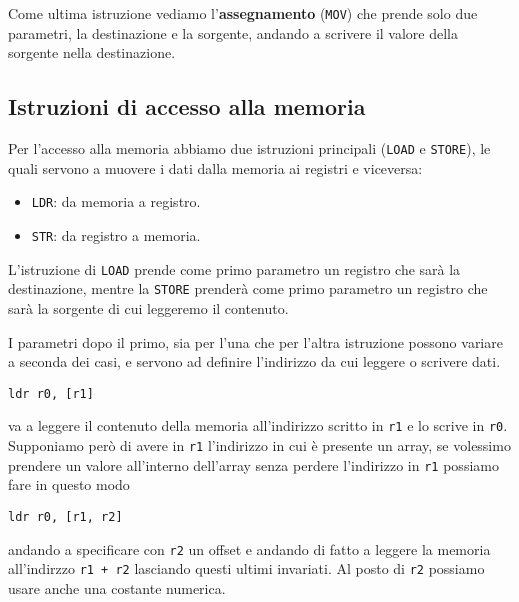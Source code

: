 Come ultima istruzione vediamo l'\textbf{assegnamento} (\verb|MOV|) che prende solo due parametri,
la destinazione e la sorgente, andando a scrivere il valore della sorgente nella destinazione.

\subsection{Istruzioni di accesso alla memoria}
Per l'accesso alla memoria abbiamo due istruzioni principali (\verb|LOAD| e \verb|STORE|), le quali
servono a muovere i dati dalla memoria ai registri e viceversa:
\begin{itemize}
	\item \verb|LDR|: da memoria a registro.
	\item \verb|STR|: da registro a memoria.
\end{itemize}
L'istruzione di \verb|LOAD| prende come primo parametro un registro che sarà la destinazione,
mentre la \verb|STORE| prenderà come primo parametro un registro che sarà la sorgente di cui
leggeremo il contenuto.

I parametri dopo il primo, sia per l'una che per l'altra istruzione possono variare a seconda dei
casi, e servono ad definire l'indirizzo da cui leggere o scrivere dati.
\begin{verbatim}
ldr r0, [r1]
\end{verbatim}
va a leggere il contenuto della memoria all'indirizzo scritto in \verb|r1| e lo scrive in \verb|r0|.
Supponiamo però di avere in \verb|r1| l'indirizzo in cui è presente un array, se volessimo prendere
un valore all'interno dell'array senza perdere l'indirizzo in \verb|r1| possiamo fare in questo
modo
\begin{verbatim}
ldr r0, [r1, r2]
\end{verbatim}
andando a specificare con \verb|r2| un offset e andando di fatto a leggere la memoria all'indirzzo
\verb|r1 + r2| lasciando questi ultimi invariati. Al posto di \verb|r2| possiamo usare anche una
costante numerica.

